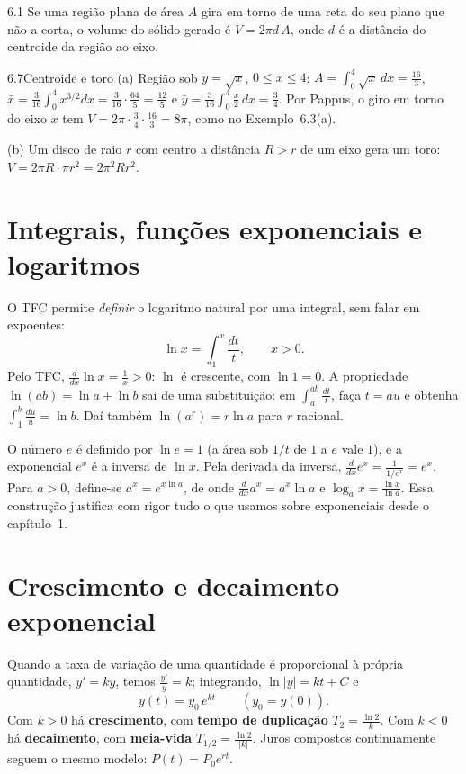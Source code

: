 \begin{teorema}{6.1}
Se uma região plana de área $A$ gira em torno de uma reta do seu plano que não a corta, o
volume do sólido gerado é $V=2\pi d\,A$, onde $d$ é a distância do centroide da região ao
eixo.
\end{teorema}

\begin{exemplo}{6.7}{Centroide e toro}
(a) Região sob $y=\sqrt x$, $0\le x\le4$: $A=\int_0^4\sqrt x\,dx=\frac{16}3$,
$\bar x=\frac3{16}\int_0^4x^{3/2}dx=\frac3{16}\cdot\frac{64}5=\frac{12}5$ e
$\bar y=\frac3{16}\int_0^4\frac x2\,dx=\frac34$.
Por Pappus, o giro em torno do eixo $x$ tem $V=2\pi\cdot\frac34\cdot\frac{16}3=8\pi$,
como no Exemplo~6.3(a).

(b) Um disco de raio $r$ com centro a distância $R>r$ de um eixo gera um toro:
$V=2\pi R\cdot\pi r^2=2\pi^2Rr^2$.
\end{exemplo}

\section{Integrais, funções exponenciais e logaritmos}

O TFC permite \emph{definir} o logaritmo natural por uma integral, sem falar em expoentes:
\[
\ln x=\int_1^x\frac{dt}t,\qquad x>0 .
\]
Pelo TFC, $\frac{d}{dx}\ln x=\frac1x>0$: $\ln$ é crescente, com $\ln1=0$. A propriedade
$\ln(ab)=\ln a+\ln b$ sai de uma substituição: em $\int_a^{ab}\frac{dt}t$, faça $t=au$ e
obtenha $\int_1^b\frac{du}u=\ln b$. Daí também $\ln(a^r)=r\ln a$ para $r$ racional.

O número $e$ é definido por $\ln e=1$ (a área sob $1/t$ de $1$ a $e$ vale $1$), e a
exponencial $e^x$ é a inversa de $\ln x$. Pela derivada da inversa,
$\frac{d}{dx}e^x=\frac1{1/e^x}=e^x$. Para $a>0$, define-se $a^x=e^{x\ln a}$, de onde
$\frac{d}{dx}a^x=a^x\ln a$ e $\log_ax=\frac{\ln x}{\ln a}$. Essa construção justifica com
rigor tudo o que usamos sobre exponenciais desde o capítulo~1.

\section{Crescimento e decaimento exponencial}

Quando a taxa de variação de uma quantidade é proporcional à própria quantidade,
$y'=ky$, temos $\frac{y'}y=k$; integrando, $\ln|y|=kt+C$ e
\[
y(t)=y_0\,e^{kt}\qquad(y_0=y(0)).
\]
Com $k>0$ há \textbf{crescimento}, com \textbf{tempo de duplicação} $T_2=\frac{\ln2}k$. Com
$k<0$ há \textbf{decaimento}, com \textbf{meia-vida} $T_{1/2}=\frac{\ln2}{|k|}$. Juros compostos
continuamente seguem o mesmo modelo: $P(t)=P_0e^{rt}$.

